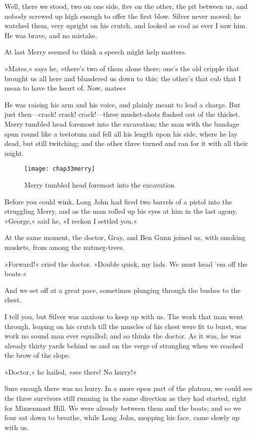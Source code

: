 Well, there we stood, two on one side, five on the other, the pit between us, and nobody screwed up high enough to offer the first blow. Silver never moved; he watched them, very upright on his crutch, and looked as cool as ever I saw him. He was brave, and no mistake.

At last Merry seemed to think a speech might help matters.

»Mates,« says he, »there's two of them alone there; one's the old cripple that brought us all here and blundered us down to this; the other's that cub that I mean to have the heart of. Now, mates\longdash«

He was raising his arm and his voice, and plainly meant to lead a charge. But just then—crack! crack! crack!—three musket-shots flashed out of the thicket. Merry tumbled head foremost into the excavation; the man with the bandage spun round like a teetotum and fell all his length upon his side, where he lay dead, but still twitching; and the other three turned and ran for it with all their might.

 \begin{figure}[p]
\centering
\texttt{[image: chap33merry]}
\caption{Merry tumbled head foremost into the excavation}
\end{figure}  

Before you could wink, Long John had fired two barrels of a pistol into the struggling Merry, and as the man rolled up his eyes at him in the last agony, »George,« said he, »I reckon I settled you.«

At the same moment, the doctor, Gray, and Ben Gunn joined us, with smoking muskets, from among the nutmeg-trees.

»Forward!« cried the doctor. »Double quick, my lads. We must head 'em off the boats.«

And we set off at a great pace, sometimes plunging through the bushes to the chest.

I tell you, but Silver was anxious to keep up with us. The work that man went through, leaping on his crutch till the muscles of his chest were fit to burst, was work no sound man ever equalled; and so thinks the doctor. As it was, he was already thirty yards behind us and on the verge of strangling when we reached the brow of the slope.

»Doctor,« he hailed, »see there! No hurry!«

Sure enough there was no hurry. In a more open part of the plateau, we could see the three survivors still running in the same direction as they had started, right for Mizzenmast Hill. We were already between them and the boats; and so we four sat down to breathe, while Long John, mopping his face, came slowly up with us.

